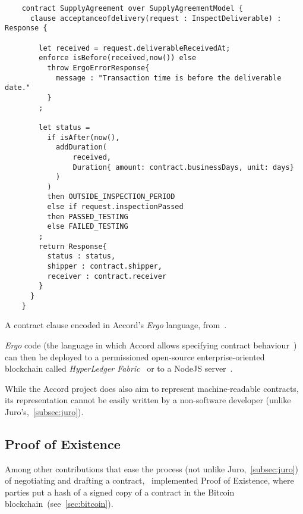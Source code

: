 \begin{listing}[th]
    \centering
    \small
    \begin{verbatim}
    contract SupplyAgreement over SupplyAgreementModel {
      clause acceptanceofdelivery(request : InspectDeliverable) : Response {

        let received = request.deliverableReceivedAt;
        enforce isBefore(received,now()) else
          throw ErgoErrorResponse{
            message : "Transaction time is before the deliverable date."
          }
        ;

        let status =
          if isAfter(now(),
            addDuration(
                received,
                Duration{ amount: contract.businessDays, unit: days}
            )
          )
          then OUTSIDE_INSPECTION_PERIOD
          else if request.inspectionPassed
          then PASSED_TESTING
          else FAILED_TESTING
        ;
        return Response{
          status : status,
          shipper : contract.shipper,
          receiver : contract.receiver
        }
      }
    }
    \end{verbatim}
    \caption[Accord contract clause as code]{A contract clause encoded in Accord's \textit{Ergo} language,
        from~\cite{accordAfterSignatureCode}.}
    \label{fig:accord-post-signature-code}
\end{listing}

\textit{Ergo} code (the language in which Accord allows specifying contract behaviour~\cite{accordErgo}) can then be
deployed to a permissioned open-source enterprise-oriented blockchain called \textit{HyperLedger
Fabric}~\cite{hyperledgerFabric_repo, accordFabricDeployDocs} or to a NodeJS server~\cite{accordNodeJSDeployDocs}.

While the Accord project does also aim to represent machine-readable contracts, its representation
cannot be easily written by a non-software developer (unlike Juro's,~\autoref{subsec:juro}).

\subsection{Proof of Existence}\label{subsec:proof-of-existence}

Among other contributions that ease the process (not unlike Juro,~\autoref{subsec:juro}) of negotiating
and drafting a contract,~\cite[Express Agreement]{expressAgreement} implemented Proof of Existence,
where parties put a hash of a signed copy of a contract in the Bitcoin blockchain~(see~\autoref{sec:bitcoin}).


